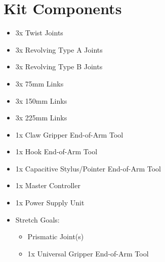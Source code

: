 \section{Kit Components}
\label{app:KitParts}
\begin{itemize}
\item 3x Twist Joints
\item 3x Revolving Type A Joints
\item 3x Revolving Type B Joints
\item 3x 75mm Links
\item 3x 150mm Links
\item 3x 225mm Links
\item 1x Claw Gripper End-of-Arm Tool
\item 1x Hook End-of-Arm Tool
\item 1x Capacitive Stylus/Pointer End-of-Arm Tool
\item 1x Master Controller
\item 1x Power Supply Unit
\item Stretch Goals:
\begin{itemize}
\item Prismatic Joint(s)
\item 1x Universal Gripper End-of-Arm Tool
\end{itemize}
\end{itemize}